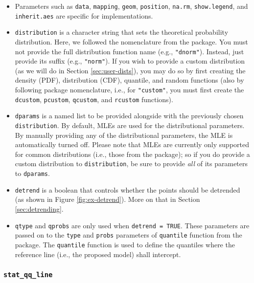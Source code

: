 \begin{itemize}
\item
  Parameters such as \texttt{data}, \texttt{mapping}, \texttt{geom},
  \texttt{position}, \texttt{na.rm}, \texttt{show.legend}, and
  \texttt{inherit.aes} are specific for  implementations.
\item
  \texttt{distribution} is a character string that sets the theoretical
  probability distribution. Here, we followed the nomenclature from the
   package. You must not provide the full distribution
  function name (e.g., \texttt{"dnorm"}). Instead, just provide its
  suffix (e.g., \texttt{"norm"}). If you wish to provide a custom
  distribution (as we will do in Section \ref{sec:user-dists}), you may
  do so by first creating the density (PDF), distribution (CDF),
  quantile, and random functions (also by following  package
  nomenclature, i.e., for \texttt{"custom"}, you must first create the
  \texttt{dcustom}, \texttt{pcustom}, \texttt{qcustom}, and
  \texttt{rcustom} functions).
\item
  \texttt{dparams} is a named list to be provided alongside with the
  previously chosen \texttt{distribution}. By default, MLEs are used for
  the distributional parameters. By manually providing any of the
  distributional parameters, the MLE is automatically turned off. Please
  note that MLEs are currently only supported for common distributions
  (i.e., those from the  package); so if you do provide a
  custom distribution to \texttt{distribution}, be sure to provide
  \emph{all} of its parameters to \texttt{dparams}.
\item
  \texttt{detrend} is a boolean that controls whether the points should
  be detrended (as shown in Figure \ref{fig:ex-detrend}). More on that
  in Section \ref{sec:detrending}.
\item
  \texttt{qtype} and \texttt{qprobs} are only used when
  \texttt{detrend\ =\ TRUE}. These parameters are passed on to the
  \texttt{type} and \texttt{probs} parameters of \texttt{quantile}
  function from the  package. The \texttt{quantile} function
  is used to define the quantiles where the reference line (i.e., the
  proposed model) shall intercept.
\end{itemize}

\subsubsection{\texorpdfstring{\texttt{stat\_qq\_line}}{stat\_qq\_line}}\label{stat_qq_line}

